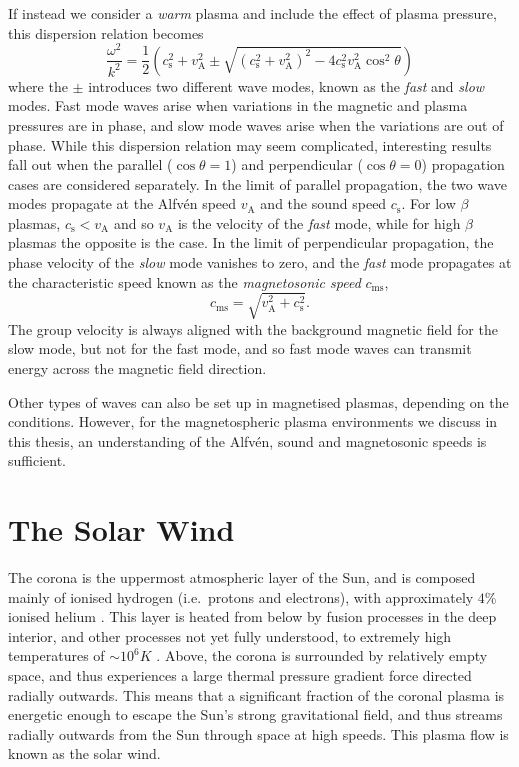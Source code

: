 If instead we consider a \textit{warm} plasma and include the effect of plasma pressure, this dispersion relation becomes
\begin{equation}
\frac{\omega^2}{k^2} = \frac{1}{2}\left(c_\mathrm{s}^2+v_\mathrm{A}^2\pm\sqrt{(c_\mathrm{s}^2+v_\mathrm{A}^2)^2-4c_\mathrm{s}^2v_\mathrm{A}^2\cos^2\theta}\right)
\end{equation}
where the $\pm$ introduces two different wave modes, known as the \textit{fast} and \textit{slow} modes. Fast mode waves arise when variations in the magnetic and plasma pressures are in phase, and slow mode waves arise when the variations are out of phase. While this dispersion relation may seem complicated, interesting results fall out when the parallel ($\cos\theta = 1$) and perpendicular ($\cos\theta = 0$) propagation cases are considered separately. In the limit of parallel propagation, the two wave modes propagate at the Alfv\'en speed $v_\mathrm{A}$ and the sound speed $c_\mathrm{s}$. For low $\beta$ plasmas, $c_\mathrm{s}<v_\mathrm{A}$ and so $v_\mathrm{A}$ is the velocity of the \textit{fast} mode, while for high $\beta$ plasmas the opposite is the case. In the limit of perpendicular propagation, the phase velocity of the \textit{slow} mode vanishes to zero, and the \textit{fast} mode propagates at the characteristic speed known as the \textit{magnetosonic speed} $c_\mathrm{ms}$,
\begin{equation}
c_\mathrm{ms} = \sqrt{v_\mathrm{A}^2+c_\mathrm{s}^2}.
\end{equation}
The group velocity is always aligned with the background magnetic field for the slow mode, but not for the fast mode, and so fast mode waves can transmit energy across the magnetic field direction. 
 
Other types of waves can also be set up in magnetised plasmas, depending on the conditions. However, for the magnetospheric plasma environments we discuss in this thesis, an understanding of the Alfv\'en, sound and magnetosonic speeds is sufficient.

\section{The Solar Wind} \label{intro:sec:solarwind}
The corona is the uppermost atmospheric layer of the Sun, and is composed mainly of ionised hydrogen (i.e.\ protons and electrons), with approximately $4\%$ ionised helium \citep{robbins1970}. This layer is heated from below by fusion processes in the deep interior, and other processes not yet fully understood, to extremely high temperatures of ${\sim}10^6\si{K}$ \citep{warren2009}. Above, the corona is surrounded by relatively empty space, and thus experiences a large thermal pressure gradient force directed radially outwards. This means that a significant fraction of the coronal plasma is energetic enough to escape the Sun's strong gravitational field, and thus streams radially outwards from the Sun through space at high speeds. This plasma flow is known as the solar wind.

